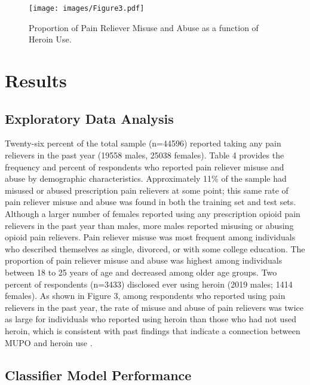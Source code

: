 \documentclass[sigconf]{acmart}
\begin{document}

\begin{figure}[!ht]
  \centering\texttt{[image: images/Figure3.pdf]}
  \caption{Proportion of Pain Reliever Misuse and Abuse
  as a function of Heroin Use.}
  \label{f:Figure3}
\end{figure}


\section{Results}

\subsection{Exploratory Data Analysis}

Twenty-six percent of the total sample (n=44596) reported taking any pain 
relievers in the past year (19558 males, 25038 females). 
Table 4 provides the frequency and percent of respondents who reported 
pain reliever misuse and abuse by demographic characteristics. 
Approximately 11\% of the sample had misused or abused prescription pain 
relievers at some point; this same rate of pain reliever misuse and abuse 
was found in both the training set and test sets. Although a larger
number of females reported using any prescription opioid pain relievers in 
the past year than males, more males reported misusing or abusing opioid 
pain relievers. Pain reliever misuse was most frequent among individuals who 
described themselves as single, divorced, or with some college education. 
The proportion of pain reliever misuse and abuse was highest among 
individuals between 18 to 25 years of age and decreased among older age 
groups. Two percent of respondents (n=3433) disclosed ever using heroin 
(2019 males; 1414 females). As shown in Figure 3, among respondents who 
reported using pain relievers in the past year, the rate of misuse and abuse 
of pain relievers was twice as large for individuals who reported using 
heroin than those who had not used heroin, which is consistent with 
past findings that indicate a connection between MUPO and heroin use 
\cite{muhuri13, unick13}.
 
 
\subsection{Classifier Model Performance}
\end{document}
